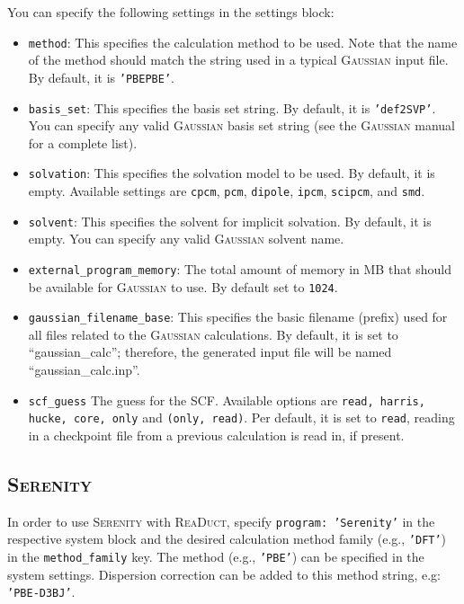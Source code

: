 \documentclass[]{tufte-book}
\begin{document}
You can specify the following settings in the settings block:
\begin{itemize}
\item \texttt{method}:
This specifies the calculation method to be used.
Note that the name of the method should match the string used in a typical \textsc{Gaussian} input file.
By default, it is \texttt{'PBEPBE'}.
\item \texttt{basis\_set}: This specifies the basis set string. By default, it is \texttt{'def2SVP'}. You can specify
any valid \textsc{Gaussian} basis set string (see the \textsc{Gaussian} manual for a complete list).
\item \texttt{solvation}: This specifies the solvation model to be used. By default, it is empty. Available settings are \texttt{cpcm}, \texttt{pcm}, \texttt{dipole}, \texttt{ipcm}, \texttt{scipcm},
and \texttt{smd}.
\item \texttt{solvent}: This specifies the solvent for implicit solvation. By default, it is empty. You can specify any valid \textsc{Gaussian} solvent name.
\item \texttt{external\_program\_memory}: The total amount of memory in MB that should be available for \textsc{Gaussian} to use.
By default set to \texttt{1024}.
\item \texttt{gaussian\_filename\_base}: This specifies the basic filename (prefix) used for all files related to the \textsc{Gaussian} calculations.
By default, it is set to ``gaussian\_calc''; therefore, the generated input file will be named ``gaussian\_calc.inp''.
\item \texttt{scf\_guess} The guess for the SCF. Available options are \texttt{read, harris, hucke, core, only} and \texttt{(only, read)}. Per default, it is set to \texttt{read}, reading in a checkpoint file from a previous calculation is read in, if present.
\end{itemize}


\subsection{\textsc{Serenity}}

In order to use \textsc{Serenity} with \textsc{ReaDuct}, specify \texttt{program: 'Serenity'} in the respective system block and the desired
calculation method family (e.g., \texttt{'DFT'}) in the \texttt{method\_family} key.
The method (e.g., \texttt{'PBE'}) can be specified in the system settings. Dispersion correction can be added to this method string, e.g: \texttt{'PBE-D3BJ'}.
\end{document}
